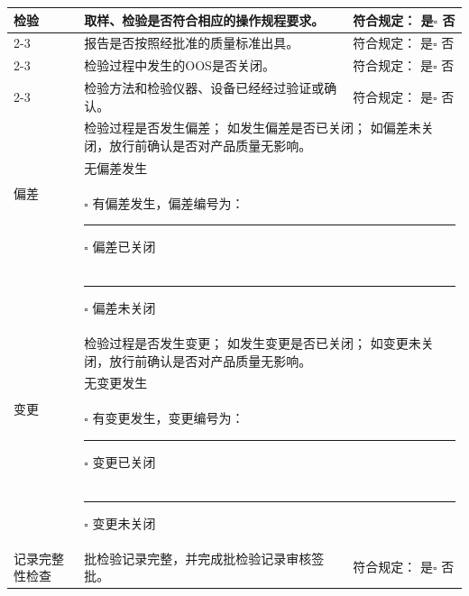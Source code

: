 \documentclass[UTF8,10pt,a4paper,fontset=fandol]{ctexart}
\newcommand{\fieldvalue}[1]{#1}
\begin{document}
\begin{tabularx}{\textwidth}{|p{}|X|p{}|}
\hline
\multirow{4}{*}{检验}
& 取样、检验是否符合相应的操作规程要求。 &
符合规定：
\fieldvalue{是}\quad $\square$ 否 \\ \cline{2-3}
& 报告是否按照经批准的质量标准出具。 &
符合规定：
\fieldvalue{是}\quad $\square$ 否 \\ \cline{2-3}
& 检验过程中发生的OOS是否关闭。 &
符合规定：
\fieldvalue{是}\quad $\square$ 否 \\ \cline{2-3}
& 检验方法和检验仪器、设备已经经过验证或确认。 &
符合规定：
\fieldvalue{是}\quad $\square$ 否 \\
\hline
\multirow{3}{*}{偏差}
& \multicolumn{2}{l|}{%
检验过程是否发生偏差；\newline
如发生偏差是否已关闭；\newline
如偏差未关闭，放行前确认是否对产品质量无影响。}
\\[-2pt]
& \multicolumn{2}{l|}{%
\fieldvalue{无偏差发生}}\\
& \multicolumn{2}{l|}{$\square$ 有偏差发生，偏差编号为：\rule{3cm}{0.4pt}
\quad $\square$ 偏差已关闭}\\
& \multicolumn{2}{l|}{\rule{3cm}{0.4pt}\quad $\square$ 偏差未关闭}\\
\hline
\multirow{3}{*}{变更}
& \multicolumn{2}{l|}{%
检验过程是否发生变更；\newline
如发生变更是否已关闭；\newline
如变更未关闭，放行前确认是否对产品质量无影响。}
\\[-2pt]
& \multicolumn{2}{l|}{%
\fieldvalue{无变更发生}}\\
& \multicolumn{2}{l|}{$\square$ 有变更发生，变更编号为：\rule{3cm}{0.4pt}
\quad $\square$ 变更已关闭}\\
& \multicolumn{2}{l|}{\rule{3cm}{0.4pt}\quad $\square$ 变更未关闭}\\
\hline
记录完整性检查
& 批检验记录完整，并完成批检验记录审核签批。 &
符合规定：
\fieldvalue{是}\quad $\square$ 否 \\
\hline
\end{tabularx}
\end{document}
